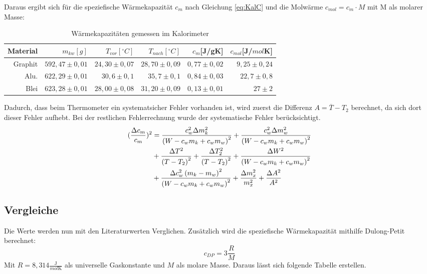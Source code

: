 Daraus ergibt sich für die speziefische Wärmekapazität $c_m$ nach Gleichung \ref{eq:KalC} und die Molwärme $c_{mol} = c_m\cdot M$ mit M als molarer Masse:

\begin{table}[h!]
    \centering
    \begin{tabular}{r r r r r r}
        \toprule
        Material & $m_{kw}[g]$& $T_{vor} [^\circ C] $&  $T_{nach}[^\circ C] $& $c_m$[J/gK] & $c_{mol}$[J/$mol$K] \\
        \midrule
        Graphit & $592,47 \pm 0,01 $ & $24,30 \pm 0,07$ & $28,70 \pm 0,09$ & $0,77 \pm 0,02 $ & $9,25\pm0,24$\\
        Alu. &$622,29 \pm 0,01$ &$30,6 \pm 0,1 $&$ 35,7 \pm0,1$& $0,84 \pm 0,03$ & $22,7 \pm 0,8$\\
        Blei & $ 623,28 \pm 0,01$ & $28,00 \pm 0,08$& $31,20 \pm 0,09$ & $0,13 \pm 0,01$ & $27 \pm 2$\\
        \bottomrule
        
    \end{tabular}
    \caption{Wärmekapazitäten gemessen im Kalorimeter}
\end{table}
Dadurch, dass beim Thermometer ein systematsicher Fehler vorhanden ist, wird zuerst die Differenz $A = \overline{T} - T_2$ berechnet, da sich dort dieser Fehler aufhebt.
Bei der restlichen Fehlerrechnung wurde der systematische Fehler berücksichtigt.
\begin{align}
    (\frac{\Delta c_m}{c_m})^2 &=\frac{c_{w}^{2} \Delta m_{k}^{2}}{\left(W - c_{w} m_{k} + c_{w} m_{w}\right)^{2}} + \frac{c_{w}^{2} \Delta m_{w}^{2}}{\left(W - c_{w} m_{k} + c_{w} m_{w}\right)^{2}} \notag \\
    & + \frac{\Delta T^{2}}{\left(T - T_{2}\right)^{2}} + \frac{\Delta T_{2}^{2}}{\left(T - T_{2}\right)^{2}} + \frac{\Delta W^{2}}{\left(W - c_{w} m_{k} + c_{w} m_{w}\right)^{2}}\notag \\
    & + \frac{\Delta c_{w}^{2} \left(m_{k} - m_{w}\right)^{2}}{\left(W - c_{w} m_{k} + c_{w} m_{w}\right)^{2}} + \frac{\Delta m_{x}^{2}}{m_{x}^{2}} + \frac{\Delta A^{2}}{A^{2}}\notag\\
\end{align}

\subsection{Vergleiche}
Die Werte werden nun mit den Literaturwerten Verglichen. Zusätzlich wird die speziefische Wärmekapazität
mithilfe Dulong-Petit berechnet:
\begin{equation}
    c_{DP} = 3 \frac{R}{M}
\end{equation}
Mit $R = 8,314 \frac{\text{J}}{mol \text{K}}$ als universelle Gaskonstante und $M$ als molare Masse. Daraus
lässt sich folgende Tabelle erstellen.

